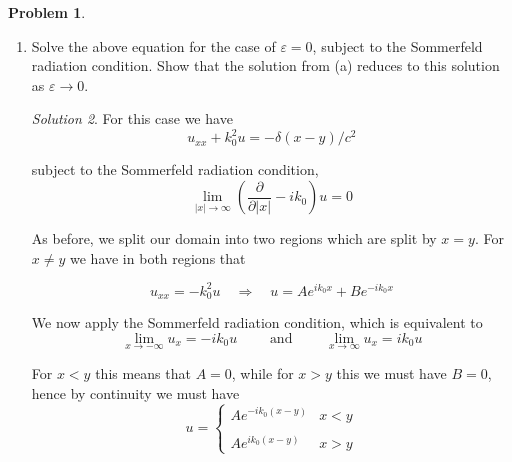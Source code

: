 \documentclass[12pt,a4paper]{article}
\theoremstyle{definition}
\newtheorem{problem}{Problem}
\theoremstyle{remark}
\newtheorem*{solution}{Solution}
\begin{document}
\begin{problem}
\begin{enumerate}[label=(\alph*)]
\begin{solution}
            This negative jump in the derivative of $u$ enables us to compute the coefficient value $A$. We have 

            \begin{align*}
                -\frac{1}{c^2} = u_x^+ - u_x^- &=  2i \sqrt{k_0^2 + i \varepsilon \frac{k_0}{c}} A && \Rightarrow && A = \frac{i}{2 c \sqrt{c^2k_0^2 + i \varepsilon c k_0}}
            \end{align*}

            Hence our solution is given by $$u = \begin{cases}
                \frac{i}{2 c \sqrt{c^2k_0^2 + i \varepsilon c k_0}} \exp \left(-i \sqrt{k_0^2 + i \varepsilon k_0/c} (x-y)\right) & x < y \\\\
                \frac{i}{2 c \sqrt{c^2k_0^2 + i \varepsilon c k_0}} \exp \left( i \sqrt{k_0^2 + i \varepsilon k_0/c} (x-y)\right) & x > y
            \end{cases}$$
        \end{solution}

        \item Solve the above equation for the case of $\varepsilon = 0$, subject to the Sommerfeld radiation condition. Show that the solution from (a) reduces to this solution as $\varepsilon \rightarrow 0$. 
        \begin{solution}
            For this case we have $$u_{xx} + k_0^2 u = - \delta(x-y)/c^2$$

            subject to the Sommerfeld radiation condition, $$\lim_{|x|\rightarrow \infty} \left( \frac{\partial}{\partial |x|} - ik_0 \right) u = 0$$

            As before, we split our domain into two regions which are split by $x=y$. For $x\ne y$ we have in both regions that 

            $$u_{xx} = -k_0^2 u \quad \Rightarrow \quad u = A e^{ik_0 x}+ B e^{-ik_0 x}$$

            We now apply the Sommerfeld radiation condition, which is equivalent to $$\lim_{x \rightarrow - \infty} u_x = - ik_0 u \qquad \text{ and } \qquad \lim_{x \rightarrow \infty} u_x = ik_0 u$$

            For $x < y$ this means that $A=0$, while for $x >y$ this we must have $B=0$, hence by continuity we must have $$u = \begin{cases}
                A e^{-ik_0 (x-y)} & x< y \\\\
                A e^{ik_0 (x-y)} & x > y
            \end{cases}$$


\end{solution}
\end{enumerate}
\end{problem}
\end{document}
